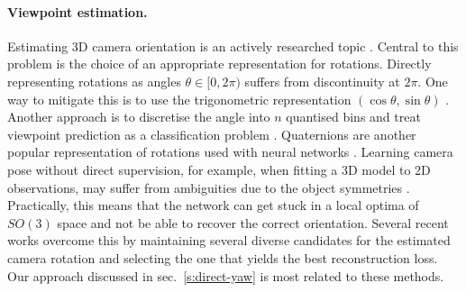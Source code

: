 \paragraph{Viewpoint estimation.}
Estimating 3D camera orientation is an actively researched topic \cite{pepik12teaching, kendall2015posenet, tulsiani15viewpoints, su2015render, mousavian20173d, prokudin2018deep, liao2019spherical}. Central to this problem is the choice of an appropriate representation for rotations. Directly representing rotations as angles $\theta \in [0, 2\pi )$ suffers from discontinuity at $2\pi$. One way to mitigate this is to use the trigonometric representation $(\cos \theta, \sin \theta)$ \cite{penedones2012improving, massa2016crafting, beyer2015biternion}. Another approach is to discretise the angle into $n$ quantised bins and treat viewpoint prediction as a classification problem \cite{tulsiani15viewpoints, su2015render, mousavian20173d}. Quaternions are another popular representation of rotations used with neural networks \cite{kendall2015posenet, xiang2017posecnn}. Learning camera pose without direct supervision, for example, when fitting a 3D model to 2D observations, may suffer from ambiguities due to the object symmetries \cite{saxena2009learning}. Practically, this means that the network can get stuck in a local optima of $SO(3)$ space and not be able to recover the correct orientation. Several recent works \cite{tulsiani2018multi, insafutdinov18pointclouds, goel20shape} overcome this by maintaining several diverse candidates for the estimated camera rotation and selecting the one that yields the best reconstruction loss. Our approach discussed in sec.~\ref{s:direct-yaw} is most related to these methods.

